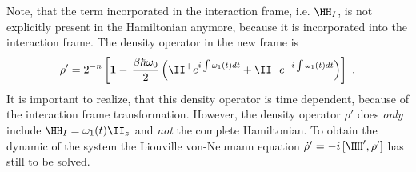 Note, that the term incorporated in the interaction frame, i.e. $\HH_I$, is not explicitly present in the Hamiltonian anymore, because it is incorporated into the interaction frame.
The density operator in the new frame is
\begin{align}
  \rho' = 2^{-n}\left[\mathbf{1}-\,  \frac{\beta \hbar \omega_0}{2}
  \left(\II^+e^{i\int\omega_1(t)dt}+ \II^-e^{-i\int\omega_1(t)dt}\right) \right]~.
\end{align}
It is important to realize, that this density operator is time dependent, because of the interaction frame transformation.  However, the density operator $\rho'$ does \textit{only} include $\HH_I=\omega_1(t) \II_z$ and \textit{not} the complete Hamiltonian. To obtain the dynamic of the system the Liouville von-Neumann equation
$
 \dot{\rho}'
  = -i\, [\HH', \rho']
$
has still to be solved.
%
%
